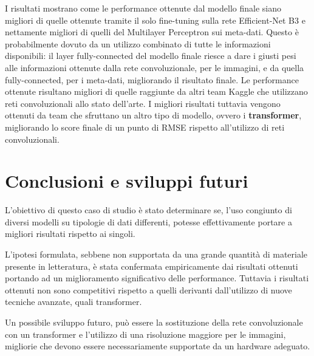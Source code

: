 I risultati mostrano come le performance ottenute dal modello finale siano migliori di quelle ottenute tramite il solo fine-tuning sulla rete Efficient-Net B3 e nettamente migliori di quelli del Multilayer Perceptron sui meta-dati. Questo è probabilmente dovuto da un utilizzo combinato di tutte le informazioni disponibili: il layer fully-connected del modello finale riesce a dare i giusti pesi alle informazioni ottenute dalla rete convoluzionale, per le immagini, e da quella fully-connected, per i meta-dati, migliorando il risultato finale. Le performance ottenute risultano migliori di quelle raggiunte da altri team Kaggle che utilizzano reti convoluzionali allo stato dell'arte. I migliori risultati tuttavia vengono ottenuti da team che sfruttano un altro tipo di modello, ovvero i \textbf{transformer}, migliorando lo score finale di un punto di RMSE rispetto all'utilizzo di reti convoluzionali.


\section{Conclusioni e sviluppi futuri}
L'obiettivo di questo caso di studio è stato determinare se, l'uso congiunto di diversi modelli su tipologie di dati differenti, potesse effettivamente portare  a migliori risultati rispetto ai singoli.

L'ipotesi formulata, sebbene non supportata da una grande quantità di materiale presente in letteratura, è stata confermata empiricamente dai risultati ottenuti portando ad un miglioramento significativo delle performance. Tuttavia i risultati ottenuti non sono competitivi rispetto a quelli derivanti dall'utilizzo di nuove tecniche avanzate, quali transformer.

Un possibile sviluppo futuro, può essere la sostituzione della rete convoluzionale con un transformer e l'utilizzo di una risoluzione maggiore per le immagini, migliorie che devono essere necessariamente supportate da un hardware adeguato.




\appendix
